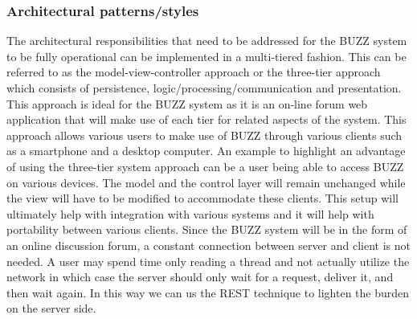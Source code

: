 \documentclass[a4paper,12pt]{article}
\begin{document}
\subsubsection{Architectural patterns/styles}
The architectural responsibilities that need to be addressed for the BUZZ system to be fully operational can be implemented in a multi-tiered fashion. This can be referred to as the model-view-controller approach or the three-tier approach which consists of persistence, logic/processing/communication and presentation. This approach is ideal for the BUZZ system as it is an on-line forum web application that will make use of each tier for related aspects of the system. This approach allows various users to make use of BUZZ through various clients such as a smartphone and a desktop computer. An example to highlight an advantage of using the three-tier system approach can be a user being able to access BUZZ on various devices. The model and the control layer will remain unchanged while the view will have to be modified to accommodate these clients.  This setup will ultimately help with integration with various systems and it will help with portability between various clients. Since the BUZZ system will be in the form of an online discussion forum, a constant connection between server and client is not needed. A user may spend time only reading a thread and not actually utilize the network in which case the server should only wait for a request, deliver it, and then wait again. In this way we can us the REST technique to lighten the burden on the server side.
\end{document}
